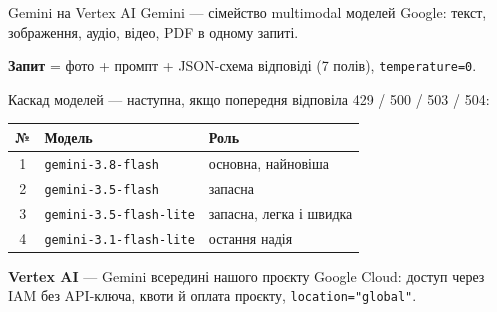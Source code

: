\documentclass[aspectratio=169,11pt]{beamer}
\newcommand{\code}[1]{\texttt{#1}}
\begin{document}
\begin{frame}{Gemini на Vertex AI}
  Gemini --- сімейство multimodal моделей Google: текст, зображення, аудіо, відео, PDF в одному запиті.

  \smallskip
  \textbf{Запит} = фото + промпт + JSON-схема відповіді (7 полів), \code{temperature=0}.

  \smallskip
  Каскад моделей --- наступна, якщо попередня відповіла 429 / 500 / 503 / 504:

  \centering
  \begin{tabular}{cll}
    \toprule
    \textbf{№} & \textbf{Модель} & \textbf{Роль} \\
    \midrule
    1 & \code{gemini-3.8-flash} & основна, найновіша \\
    2 & \code{gemini-3.5-flash} & запасна \\
    3 & \code{gemini-3.5-flash-lite} & запасна, легка і швидка \\
    4 & \code{gemini-3.1-flash-lite} & остання надія \\
    \bottomrule
  \end{tabular}

  \raggedright
  \smallskip
  \textbf{Vertex AI} --- Gemini всередині нашого проєкту Google Cloud: доступ через IAM без API-ключа,
  квоти й оплата проєкту, \code{location="global"}.
\end{frame}
\end{document}
